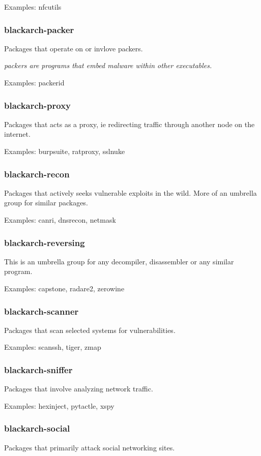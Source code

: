 \documentclass[a4paper, oneside, 11pt]{book}
\begin{document}
Examples: nfcutils

\subsubsection{blackarch-packer}
Packages that operate on or invlove packers.

\textit{packers are programs that embed malware within other executables.}

Examples: packerid

\subsubsection{blackarch-proxy}
Packages that acts as a proxy, ie redirecting traffic
through another node on the internet.

Examples: burpsuite, ratproxy, sslnuke

\subsubsection{blackarch-recon}
Packages that actively seeks vulnerable exploits in the
wild. More of an umbrella group for similar packages.

Examples: canri, dnsrecon, netmask

\subsubsection{blackarch-reversing}
This is an umbrella group for any decompiler,
disassembler or any similar program.

Examples: capstone, radare2, zerowine

\subsubsection{blackarch-scanner}
Packages that scan selected systems for vulnerabilities.

Examples: scanssh, tiger, zmap

\subsubsection{blackarch-sniffer}
Packages that involve analyzing network traffic.

Examples: hexinject, pytactle, xspy

\subsubsection{blackarch-social}
Packages that primarily attack social networking sites.
\end{document}
